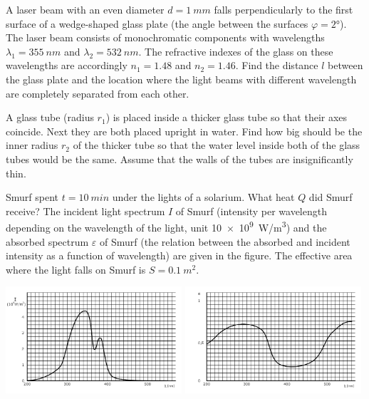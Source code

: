 \documentclass[11pt]{article}
\begin{document}

\probeng
A laser beam with an even diameter $d=\SI{1}{mm}$ falls perpendicularly to the first surface of a wedge-shaped glass plate (the angle between the surfaces $\varphi=\ang{2}$). The laser beam consists of monochromatic components with wavelengths $\lambda_1=\SI{355}{nm}$ and $\lambda_2=\SI{532}{nm}$. The refractive indexes of the glass on these wavelengths are accordingly $n_1=\num{1.48}$ and $n_2=\num{1.46}$. Find the distance $l$ between the glass plate and the location where the light beams with different wavelength are completely separated from each other.
\probend
\bigskip


\probeng
A glass tube (radius $r_1$) is placed inside a thicker glass tube so that their axes coincide. Next they are both placed upright in water. Find how big should be the inner radius $r_2$ of the thicker tube so that the water level inside both of the glass tubes would be the same. Assume that the walls of the tubes are insignificantly thin.
\probend
\bigskip


\probeng
Smurf spent $t = \SI{10}{min} $ under the lights of a solarium. What heat $ Q $ did Smurf receive? The incident light spectrum $I$ of Smurf (intensity per wavelength depending on the wavelength of the light, unit \SI{10e9}{W/m^3}) and the absorbed spectrum $\varepsilon$ of Smurf (the relation between the absorbed and incident intensity as a function of wavelength) are given in the figure. The effective area where the light falls on Smurf is $ S = \SI{0,1}{m^2} $.

\begin{center}
\includegraphics[width=0.49\textwidth]{2011-lahg-04-I}
\includegraphics[width=0.49\textwidth]{2011-lahg-04-epsilon}
\end{center}
\probend
\bigskip
\end{document}
